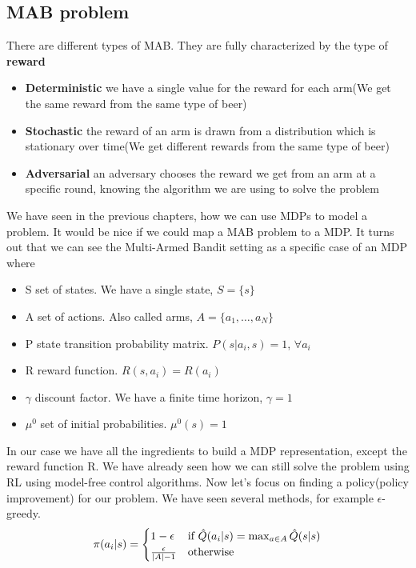 \documentclass[main.tex]{subfiles}
\begin{document}
\subsection{MAB problem}
There are different types of MAB. They are fully characterized by the type of \textbf{reward}
\begin{itemize}
    \item \textbf{Deterministic} we have a single value for the reward for each arm(We get the same reward from the same type of beer)
    \item \textbf{Stochastic} the reward of an arm is drawn from a distribution which is
          stationary over time(We get different rewards from the same type of beer)
    \item \textbf{Adversarial} an adversary chooses the reward we get from an arm at a
          specific round, knowing the algorithm we are using to solve the problem
\end{itemize}
We have seen in the previous chapters, how we can use MDPs to model a problem. It would be nice if we could map a MAB problem to a MDP. It turns out that we can see the Multi-Armed Bandit setting as a specific case of an MDP where
\begin{itemize}
    \item S set of states. We have a single state, $S=\{s\}$
    \item A set of actions. Also called arms, $A=\{a_1,\dots,a_N\}$
    \item P state transition probability matrix. $P(s|a_i,s)=1$, $\forall a_i$
    \item R reward function. $R(s,a_i)=R(a_i)$
    \item $\gamma$ discount factor. We have a finite time horizon, $\gamma=1$
    \item $\mu^0$ set of initial probabilities. $\mu^0(s)=1$
\end{itemize}
In our case we have all the ingredients to build a MDP representation, except the reward function R. We have already seen how we can still solve the problem using RL using model-free control algorithms. Now let's focus on finding a policy(policy improvement) for our problem. We have seen several methods, for example $\epsilon$-greedy.
\begin{equation}
    \pi(a_i|s)=
    \begin{cases}
        1-\epsilon             & \text{if }\Hat{Q}(a_i|s) = \max_{a \in A}\Hat{Q}(s|s) \\
        \frac{\epsilon}{|A|-1} & \text{otherwise}
    \end{cases}
\end{equation}
\end{document}
